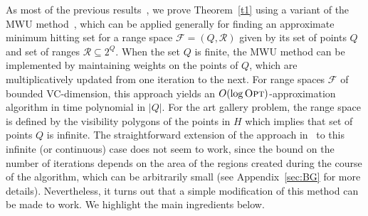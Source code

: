 \documentclass[a4paper,11pt]{article}
\def\cF{\mathcal F}
\def\cR{\mathcal R}
\def \OPT {\textsc{Opt}}
\begin{document}
As most of the previous results~\cite{AES12,AP20,BM17,EH06}, we prove Theorem~\ref{t1} using a variant of the MWU method~\cite{AHK06,BG95}, which can be applied generally for finding an approximate minimum hitting set for a range space $\cF=(Q,\cR)$ given by its set of points $Q$ and set of ranges $\cR\subseteq 2^Q$. When the set $Q$ is finite, the MWU method can be implemented by maintaining weights on the points of $Q$, which are multiplicatively updated from one iteration to the next. For range spaces $\cF$ of bounded VC-dimension, this approach yields an $O(\log\OPT)$-approximation algorithm in time polynomial in $|Q|$.  For the art gallery problem, the range space is defined by the visibility polygons of the points in $H$ which implies that set of points $Q$ is infinite. The straightforward extension of the approach in~\cite{BG95} to this infinite (or continuous) case does not seem to work, since the bound on the number of iterations depends on the area of the regions created during the course of the algorithm, which can be arbitrarily small (see Appendix~\ref{sec:BG} for more details). %
Nevertheless, it turns out that a simple modification of this method can be made to work. We highlight the main ingredients below.
\end{document}
